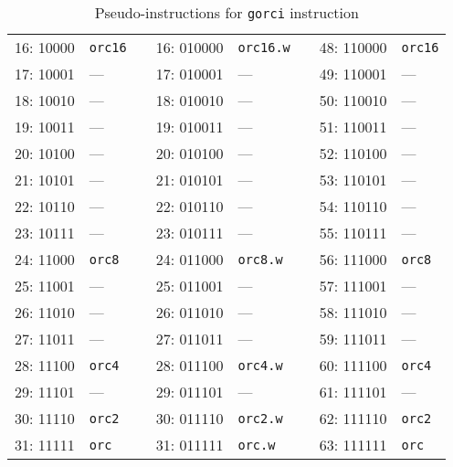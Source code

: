 \begin{table}[h]
\begin{small}
\begin{center}
\begin{tabular}{r l p{0.5in} r l p{0.3in} r l}
\cline{1-2}
\cline{4-5}
\cline{7-8}

16: 10000 & {\tt orc16}   &   & 16: 010000 & {\tt orc16.w} &   & 48: 110000 & {\tt orc16} \\
17: 10001 & ---           &   & 17: 010001 & ---           &   & 49: 110001 & ---         \\
18: 10010 & ---           &   & 18: 010010 & ---           &   & 50: 110010 & ---         \\
19: 10011 & ---           &   & 19: 010011 & ---           &   & 51: 110011 & ---         \\
20: 10100 & ---           &   & 20: 010100 & ---           &   & 52: 110100 & ---         \\
21: 10101 & ---           &   & 21: 010101 & ---           &   & 53: 110101 & ---         \\
22: 10110 & ---           &   & 22: 010110 & ---           &   & 54: 110110 & ---         \\
23: 10111 & ---           &   & 23: 010111 & ---           &   & 55: 110111 & ---         \\

\cline{1-2}
\cline{4-5}
\cline{7-8}

24: 11000 & {\tt orc8}    &   & 24: 011000 & {\tt orc8.w}  &   & 56: 111000 & {\tt orc8}  \\
25: 11001 & ---           &   & 25: 011001 & ---           &   & 57: 111001 & ---         \\
26: 11010 & ---           &   & 26: 011010 & ---           &   & 58: 111010 & ---         \\
27: 11011 & ---           &   & 27: 011011 & ---           &   & 59: 111011 & ---         \\
28: 11100 & {\tt orc4}    &   & 28: 011100 & {\tt orc4.w}  &   & 60: 111100 & {\tt orc4}  \\
29: 11101 & ---           &   & 29: 011101 & ---           &   & 61: 111101 & ---         \\
30: 11110 & {\tt orc2}    &   & 30: 011110 & {\tt orc2.w}  &   & 62: 111110 & {\tt orc2}  \\
31: 11111 & {\tt orc}     &   & 31: 011111 & {\tt orc.w}   &   & 63: 111111 & {\tt orc}   \\
\end{tabular}
\end{center}
\end{small}
\caption{Pseudo-instructions for {\tt gorci} instruction}
\label{gorci-modes}
\end{table}

